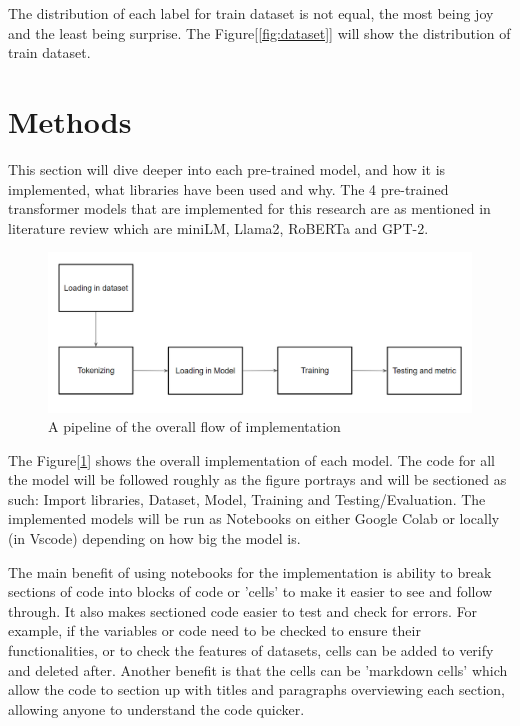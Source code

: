 The distribution of each label for train dataset is not equal, the most being joy and the least being surprise. The Figure[\ref{fig:dataset}] will show the distribution of train dataset. 

\section{Methods}

This section will dive deeper into each pre-trained model, and how it is implemented, what libraries have been used and why. The 4 pre-trained transformer models that are implemented for this research are as mentioned in literature review which are miniLM, Llama2, RoBERTa and GPT-2.

\begin{figure}[ht]
    \centerline{\includegraphics[scale=0.45]{Figures/problem_pipeline.png}}
    \caption{A pipeline of the overall flow of implementation}
    \label{fig:pipeline}
\end{figure}

The Figure[\ref{fig:pipeline}] shows the overall implementation of each model. The code for all the model will be followed roughly as the figure portrays and will be sectioned as such: Import libraries, Dataset, Model, Training and Testing/Evaluation. The implemented models will be run as Notebooks on either Google Colab or locally (in Vscode) depending on how big the model is.

The main benefit of using notebooks for the implementation is ability to break sections of code into blocks of code or 'cells' to make it easier to see and follow through. It also makes sectioned code easier to test and check for errors. For example, if the variables or code need to be checked to ensure their functionalities, or to check the features of datasets, cells can be added to verify and deleted after. Another benefit is that the cells can be 'markdown cells' which allow the code to section up with titles and paragraphs overviewing each section, allowing anyone to understand the code quicker.

